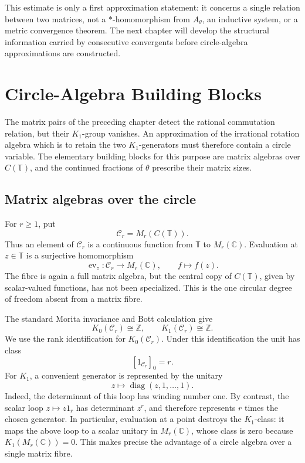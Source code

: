 \documentclass{book}
\begin{document}
This estimate is only a first approximation statement: it concerns a
single relation between two matrices, not a \(*\)-homomorphism from
\(A_\theta\), an inductive system, or a metric convergence theorem.  The
next chapter will develop the structural information carried by consecutive
convergents before circle-algebra approximations are constructed.

\chapter{Circle-Algebra Building Blocks}

The matrix pairs of the preceding chapter detect the rational commutation
relation, but their \(K_1\)-group vanishes.  An approximation of the
irrational rotation algebra which is to retain the two \(K_1\)-generators
must therefore contain a circle variable.  The elementary building blocks
for this purpose are matrix algebras over \(C(\mathbb T)\), and the
continued fractions of \(\theta\) prescribe their matrix sizes.

\section{Matrix algebras over the circle}

For \(r\geq1\), put
\[
  \mathcal C_r=M_r(C(\mathbb T)).
\]
Thus an element of \(\mathcal C_r\) is a continuous function from
\(\mathbb T\) to \(M_r(\mathbb C)\).  Evaluation at \(z\in\mathbb T\)
is a surjective homomorphism
\[
  \operatorname{ev}_z\colon\mathcal C_r\longrightarrow M_r(\mathbb C),
  \qquad f\longmapsto f(z).
\]
The fibre is again a full matrix algebra, but the central copy of
\(C(\mathbb T)\), given by scalar-valued functions, has not been
specialized.  This is the one circular degree of freedom absent from a
matrix fibre.

The standard Morita invariance and Bott calculation give
\[
  K_0(\mathcal C_r)\cong\mathbb Z,
  \qquad
  K_1(\mathcal C_r)\cong\mathbb Z.
\]
We use the rank identification for \(K_0(\mathcal C_r)\).  Under this
identification the unit has class
\[
  [1_{\mathcal C_r}]_0=r.
\]
For \(K_1\), a convenient generator is represented by the unitary
\[
  z\longmapsto \operatorname{diag}(z,1,\ldots,1).
\]
Indeed, the determinant of this loop has winding number one. By contrast,
the scalar loop \(z\mapsto z1_r\) has determinant \(z^r\), and therefore
represents \(r\) times the chosen generator.
In particular, evaluation at a point destroys the \(K_1\)-class: it maps
the above loop to a scalar unitary in \(M_r(\mathbb C)\), whose class is
zero because \(K_1(M_r(\mathbb C))=0\).  This makes precise the advantage
of a circle algebra over a single matrix fibre.
\end{document}
